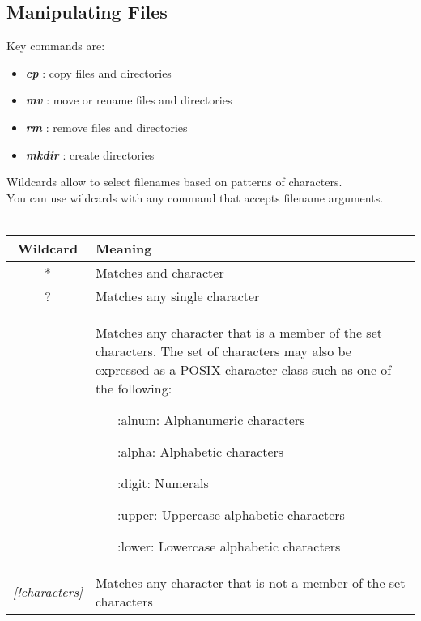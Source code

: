 \documentclass[10pt,letterpaper]{book}
\begin{document}
\subsection{Manipulating Files}
Key commands are:
\begin{itemize}
\item \textit{\textbf{cp}} : copy files and directories
\item \textit{\textbf{mv}} : move or rename files and directories
\item \textit{\textbf{rm}} : remove files and directories
\item \textit{\textbf{mkdir}} : create directories
\end{itemize}
Wildcards allow to select filenames based on patterns of characters.\\
You can use wildcards with any command that accepts filename arguments.\\
\\
\begin{tabular}{|c|p{10cm}|}
\hline
\textbf{Wildcard} & \textbf{Meaning}\\ \hline
* & Matches and character \\ \hline
? & Matches any single character \\ \hline
[\textit{characters}] & Matches any character that is a member of the set characters. The set of characters may also be expressed as a POSIX character class such as one of the following:  
\begin{itemize}
\item [:alnum:] 	Alphanumeric characters
\item [:alpha:] 	Alphabetic characters
\item [:digit:] 	Numerals
\item [:upper:] 	Uppercase alphabetic characters
\item [:lower:] 	Lowercase alphabetic characters
\end{itemize} \\ \hline
\textit{[!characters]} & Matches any character that is not a member of the set characters\\ \hline
\end{tabular}
\end{document}
